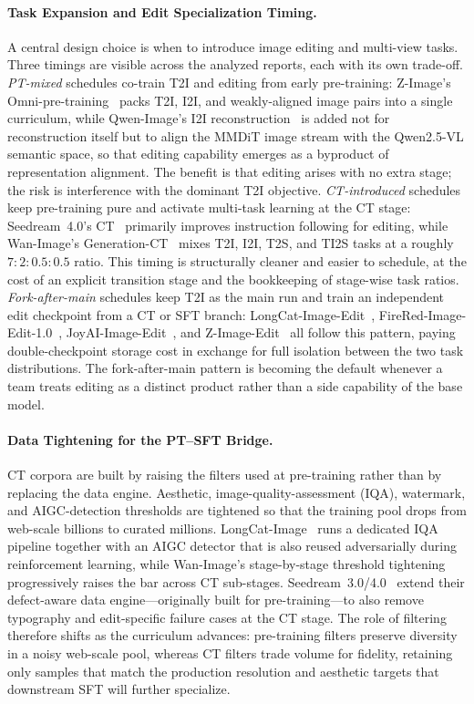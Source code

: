 \paragraph{Task Expansion and Edit Specialization Timing.}
{A central design choice is when to introduce image editing and multi-view tasks. Three timings are visible across the analyzed reports, each with its own trade-off. \textit{PT-mixed} schedules co-train T2I and editing from early pre-training: Z-Image's Omni-pre-training~\citep{cai2025z} packs T2I, I2I, and weakly-aligned image pairs into a single curriculum, while Qwen-Image's I2I reconstruction~\citep{wu2025qwen} is added not for reconstruction itself but to align the MMDiT image stream with the Qwen2.5-VL semantic space, so that editing capability emerges as a byproduct of representation alignment. The benefit is that editing arises with no extra stage; the risk is interference with the dominant T2I objective. \textit{CT-introduced} schedules keep pre-training pure and activate multi-task learning at the CT stage: Seedream~4.0's CT~\citep{seedream2025seedream} primarily improves instruction following for editing, while Wan-Image's Generation-CT~\citep{mao2026wan} mixes T2I, I2I, T2S, and TI2S tasks at a roughly $7{:}2{:}0.5{:}0.5$ ratio. This timing is structurally cleaner and easier to schedule, at the cost of an explicit transition stage and the bookkeeping of stage-wise task ratios. \textit{Fork-after-main} schedules keep T2I as the main run and train an independent edit checkpoint from a CT or SFT branch: LongCat-Image-Edit~\citep{team2025longcat}, FireRed-Image-Edit-1.0~\citep{team2026firered}, JoyAI-Image-Edit~\citep{jdjoyaiimage}, and Z-Image-Edit~\citep{cai2025z} all follow this pattern, paying double-checkpoint storage cost in exchange for full isolation between the two task distributions. The fork-after-main pattern is becoming the default whenever a team treats editing as a distinct product rather than a side capability of the base model.}

\paragraph{Data Tightening for the PT--SFT Bridge.}
{CT corpora are built by raising the filters used at pre-training rather than by replacing the data engine. Aesthetic, image-quality-assessment (IQA), watermark, and AIGC-detection thresholds are tightened so that the training pool drops from web-scale billions to curated millions. LongCat-Image~\citep{team2025longcat} runs a dedicated IQA pipeline together with an AIGC detector that is also reused adversarially during reinforcement learning, while Wan-Image's stage-by-stage threshold tightening~\citep{mao2026wan} progressively raises the bar across CT sub-stages. Seedream~3.0/4.0~\citep{gao2025seedream,seedream2025seedream} extend their defect-aware data engine---originally built for pre-training---to also remove typography and edit-specific failure cases at the CT stage. The role of filtering therefore shifts as the curriculum advances: pre-training filters preserve diversity in a noisy web-scale pool, whereas CT filters trade volume for fidelity, retaining only samples that match the production resolution and aesthetic targets that downstream SFT will further specialize.}

